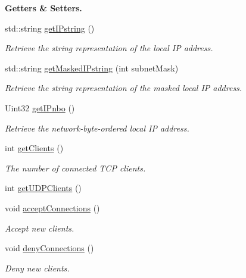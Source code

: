 \begin{Indent}{\bf Getters \& Setters.}
\begin{DoxyCompactItemize}
std\-::string \hyperlink{classNetManager_a96a48522e350bbf881f131e443c3079c}{get\-I\-Pstring} ()
\begin{DoxyCompactList}\small\item\em Retrieve the string representation of the local I\-P address. \end{DoxyCompactList}\item 
std\-::string \hyperlink{classNetManager_a3619e5825e0374cbef14531df09b6357}{get\-Masked\-I\-Pstring} (int subnet\-Mask)
\begin{DoxyCompactList}\small\item\em Retrieve the string representation of the masked local I\-P address. \end{DoxyCompactList}\item 
Uint32 \hyperlink{classNetManager_a0c1ce6d86b341f7586199fc1c3cdf933}{get\-I\-Pnbo} ()
\begin{DoxyCompactList}\small\item\em Retrieve the network-\/byte-\/ordered local I\-P address. \end{DoxyCompactList}\item 
int \hyperlink{classNetManager_a3a0e39e551ae5d3feb67834292ed8a77}{get\-Clients} ()
\begin{DoxyCompactList}\small\item\em The number of connected T\-C\-P clients. \end{DoxyCompactList}\item 
int \hyperlink{classNetManager_a785826341013e957efbff6d6581c6d56}{get\-U\-D\-P\-Clients} ()
\item 
void \hyperlink{classNetManager_ad29fa15de0d876d7bd12558faa2afdc9}{accept\-Connections} ()
\begin{DoxyCompactList}\small\item\em Accept new clients. \end{DoxyCompactList}\item 
void \hyperlink{classNetManager_a4ee8557b8eccb84ff3a00b8fc1a68308}{deny\-Connections} ()
\begin{DoxyCompactList}\small\item\em Deny new clients. \end{DoxyCompactList}\end{DoxyCompactItemize}
\end{Indent}
